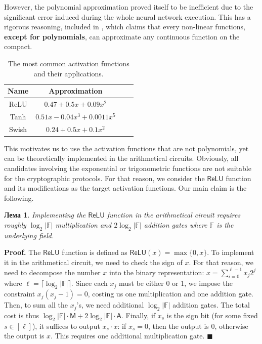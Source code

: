 \documentclass[12pt,a4paper,oneside]{book}
\theoremstyle{dplplain}
\newtheorem{lemma}[theorem]{Лема}%
\theoremstyle{dpldefinition}
\theoremstyle{dplremark}
\begin{document}
However, the polynomial approximation proved itself to be inefficient due 
to the significant error induced during the whole neural network execution. 
This has a rigorous reasoning, included in \cite{not-polynomials}, which 
claims that every non-linear functions, \textbf{except for polynomials},
can approximate any continuous function on the compact. 

\begin{table}[H]
    \centering
    \begin{tabular}{cccc}
        \hline
        \textbf{Name} & \textbf{Approximation} \\
        \hline
        ReLU & $0.47 + 0.5x + 0.09x^2$ \\
        Tanh & $0.51x - 0.04x^3 + 0.0011x^5$ \\
        Swish & $0.24 + 0.5x + 0.1x^2$\\
        \hline
    \end{tabular}
    \caption{The most common activation functions and their applications.}
    \label{table:activations-appr}
\end{table}

This motivates us to use the activation functions that are not polynomials, yet
can be theoretically implemented in the arithmetical circuits. Obviously, all
candidates involving the exponential or trigonometric functions are not suitable
for the cryptographic protocols. For that reason, we consider the
$\mathsf{ReLU}$ function and its modifications as the target activation
functions. Our main claim is the following.
\begin{lemma}
    Implementing the $\mathsf{ReLU}$ function in the arithmetical circuit 
    requires roughly $\log_2 |\mathbb{F}|$ multiplication and $2\log_2 |\mathbb{F}|$ addition gates 
    where $\mathbb{F}$ is the underlying field.
\end{lemma}

\textbf{Proof.} The $\mathsf{ReLU}$ function is defined as $\mathsf{ReLU}(x) =
\max\{0,x\}$. To implement it in the arithmetical circuit, we need to check the
sign of $x$. For that reason, we need to decompose the number $x$ into the
binary representation: $x = \sum_{i=0}^{\ell-1}x_j2^j$ where $\ell =
\lceil\log_2 |\mathbb{F}|\rceil$. Since each $x_j$ must be either $0$ or $1$, we
impose the constraint $x_j(x_j-1) = 0$, costing us one multiplication and one
addition gate. Then, to sum all the $x_j$'s, we need additional
$\log_2|\mathbb{F}|$ addition gates. The total cost is thus
$\log_2|\mathbb{F}|\cdot\mathsf{M} + 2\log_2|\mathbb{F}|\cdot\mathsf{A}$.
Finally, if $x_s$ is the sign bit (for some fixed $s \in [\ell]$), it suffices to
output $x_s \cdot x$: if $x_s = 0$, then the output is $0$, otherwise the output
is $x$. This requires one additional multiplication gate. $\blacksquare$
\end{document}
